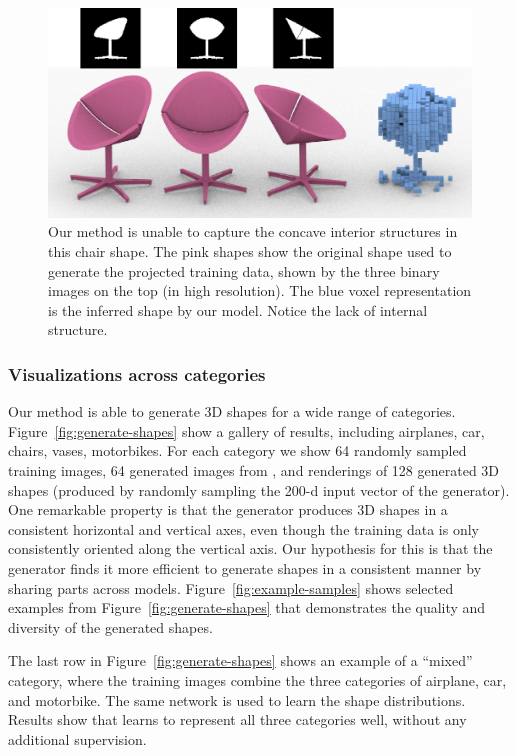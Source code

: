 \begin{figure}[t]
\centering
\includegraphics[width=0.9\linewidth]{prgan/fig/failure.png}
\caption{\label{fig:failure} Our method is unable to capture the concave interior structures in this chair shape. The pink shapes show the original shape used to generate the projected training data, shown by the three binary images on the top (in high resolution). The blue voxel representation is the inferred shape by our model. Notice the lack of internal structure.}
\end{figure}

\subsubsection{Visualizations across categories} 
Our method is able to generate 3D shapes for a wide range of
categories. 
Figure~\ref{fig:generate-shapes} show a gallery of results,
including airplanes, car, chairs, vases, motorbikes. For each category
we show 64 randomly sampled training images, 64 generated images from
\prgan, and renderings of 128 generated 3D shapes (produced by randomly
sampling the 200-d input vector of the generator). 
One remarkable property is that the generator produces 3D shapes in a
consistent horizontal and vertical axes, even though the training data
is only consistently oriented along the vertical axis. Our hypothesis
for this is that the generator finds it more efficient to generate
shapes in a consistent manner by sharing parts across
models. Figure~\ref{fig:example-samples} shows selected examples from
Figure~\ref{fig:generate-shapes} that demonstrates the quality and
diversity of the generated shapes. 

The last row in Figure~\ref{fig:generate-shapes} shows an example of a
``mixed'' category, where the training images combine the three
categories of airplane, car, and motorbike. The same \prgan network is
used to learn the shape distributions. Results show that \prgan learns
to represent all three categories well, without any additional
supervision.


